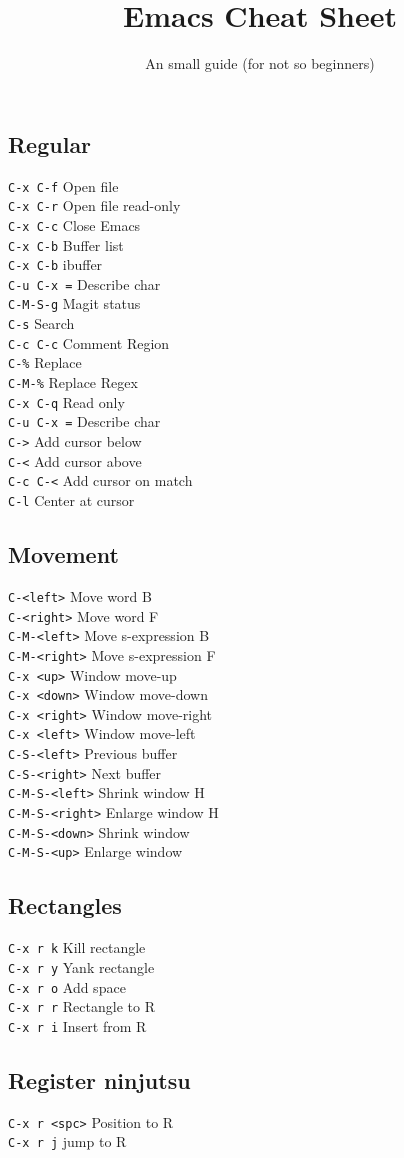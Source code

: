 \documentclass{article}
\title{\vspace{-1.5cm} Emacs Cheat Sheet}
\author{An small guide (for not so beginners)}
\date{}
\begin{document}
\newcommand{\command}[2]{
  \texttt{#1} \hfill #2 \\
}

\begin{multicols*}{4}
\maketitle
\section*{Regular}

\command{C-x C-f}{Open file}
\command{C-x C-r}{Open file read-only}
\command{C-x C-c}{Close Emacs}
\command{C-x C-b}{Buffer list}
\command{C-x C-b}{ibuffer}
\command{C-u C-x =}{Describe char}
\command{C-M-S-g}{Magit status}
\command{C-s}{Search}
\command{C-c C-c}{Comment Region}
\command{C-\%}{Replace}
\command{C-M-\%}{Replace Regex}
\command{C-x C-q}{Read only}
\command{C-u C-x =}{Describe char}
\command{C->}{Add cursor below}
\command{C-<}{Add cursor above}
\command{C-c C-<}{Add cursor on match}
\command{C-l}{Center at cursor}

\subsection*{Movement}

\command{C-<left>}{Move word B}
\command{C-<right>}{Move word F}
\command{C-M-<left>}{Move s-expression B}
\command{C-M-<right>}{Move s-expression F}
\command{C-x <up>}{Window move-up}
\command{C-x <down>}{Window move-down}
\command{C-x <right>}{Window move-right}
\command{C-x <left>}{Window move-left}
\command{C-S-<left>}{Previous buffer}
\command{C-S-<right>}{Next buffer}
\command{C-M-S-<left>}{Shrink window H}
\command{C-M-S-<right>}{Enlarge window H}
\command{C-M-S-<down>}{Shrink window}
\command{C-M-S-<up>}{Enlarge window}

\subsection*{Rectangles}
\command{C-x r k}{Kill rectangle}
\command{C-x r y}{Yank rectangle}
\command{C-x r o}{Add space}
\command{C-x r r}{Rectangle to R}
\command{C-x r i}{Insert from R}

\subsection*{Register ninjutsu}

\command{C-x r <spc>}{Position to R}
\command{C-x r j}{jump to R}


\end{multicols*}
\end{document}
